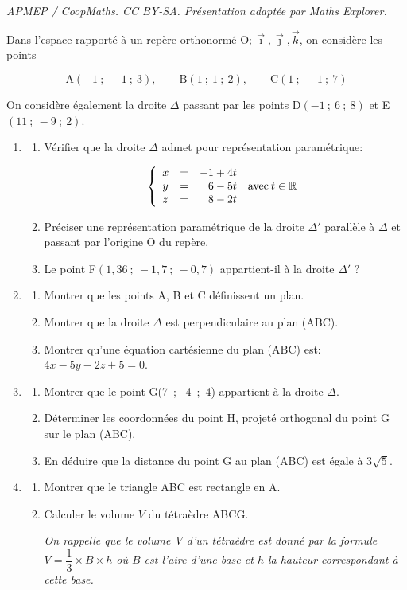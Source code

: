 \documentclass[10pt]{article}
\providecommand{\R}{\mathbb{R}}
\providecommand{\Oijk}{\(\mathrm{O};\vec{\imath},\vec{\jmath},\vec{k}\)}
\begin{document}
\noindent\textit{APMEP / CoopMaths. CC BY-SA. Présentation adaptée par Maths Explorer.}\par\medskip
\medskip

Dans l'espace rapporté à un repère orthonormé \Oijk, on considère les points

\[\text{A}(-1~;~-1~;~3),\qquad \text{B}(1~;~1~;~2),\qquad  \text{C}(1~;~-1~;~7)\]

On considère également la droite $\Delta$ passant par les points D$(-1~;~6~;~8)$ et E$(11~;~- 9~;~2)$.

\medskip

\begin{enumerate}
\item 
	\begin{enumerate}
		\item Vérifier que la droite $\Delta$ admet pour représentation paramétrique: 
		
\[\left\{\begin{array}{l c l}
x &=& -1 + 4t\\
y &=& \phantom{-}6 - 5t \quad\text{avec}\: t \in \R\\
z &=& \phantom{-}8 - 2t
\end{array}\right.\]

		\item Préciser une représentation paramétrique de la droite $\Delta'$ parallèle à $\Delta$ et passant par l'origine O du repère.
		\item Le point F$(1,36~;~-1,7~;~-0,7)$ appartient-il à la droite $\Delta'$ ?
	\end{enumerate}	
\item
	\begin{enumerate}
		\item Montrer que les points A, B et C définissent un plan.
		\item Montrer que la droite $\Delta$ est perpendiculaire au plan (ABC).
		\item Montrer qu'une équation cartésienne du plan (ABC) est: $4x - 5y - 2z + 5 = 0$.
	\end{enumerate}
\item
	\begin{enumerate}
		\item Montrer que le point G(7~;~-4~;~4) appartient à la droite $\Delta$.
		\item Déterminer les coordonnées du point H, projeté orthogonal du point G sur le plan (ABC).
		\item En déduire que la distance du point G au plan (ABC) est égale à $3\sqrt 5$.
	\end{enumerate}
\item
	\begin{enumerate}
		\item Montrer que le triangle ABC est rectangle en A.
		\item Calculer le volume $V$ du tétraèdre ABCG.
		
\emph{On rappelle que le volume V d'un tétraèdre est donné par la formule $V = \dfrac13 \times  B \times h$ où $B$ est l'aire d'une base et $h$ la hauteur correspondant à cette base.}
	\end{enumerate}
\end{enumerate}
\end{document}
